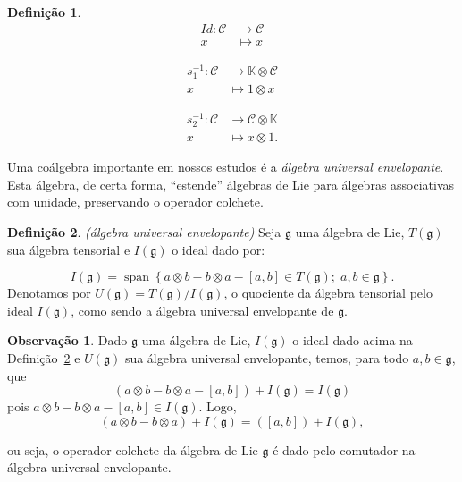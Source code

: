 \documentclass[twoside,openright,titlepage,numbers=noenddot,headinclude,  lineheaders footinclude=true,cleardoublepage=empty,
                                BCOR=5mm,paper=a4,fontsize=12pt ]{scrbook}
\theoremstyle{definition}
\newtheorem{definicao}{Definição}[chapter]
\newtheorem*{obs*}{Observação}
\DeclareMathOperator{\spn}{span}
\begin{document}
\begin{definicao}
\begin{minipage}{.33\textwidth}
    \begin{align*}
        Id: \mathcal{C} & \rightarrow \mathcal{C}\\
        x & \mapsto x
    \end{align*}
\end{minipage}%
\begin{minipage}{.33\textwidth}
    \begin{align*}
        s^{-1}_1: \mathcal{C}& \rightarrow \mathbb{K} \otimes \mathcal{C}  \\
        x & \mapsto 1\otimes x
    \end{align*}
\end{minipage}%
\begin{minipage}{.33\textwidth}
    \begin{align*}
        s^{-1}_2:  \mathcal{C}&  \rightarrow  \mathcal{C} \otimes \mathbb{K} \\
        x & \mapsto x \otimes 1.
    \end{align*}
\end{minipage}
\end{definicao}

Uma coálgebra importante em nossos estudos é a \textit{álgebra universal envelopante}.
Esta álgebra, de certa forma, ``estende'' álgebras de Lie para álgebras associativas com unidade,
preservando o operador colchete. 
\begin{definicao} 
\label{algUniv}
 \textit{(álgebra universal envelopante)} Seja $\mathfrak{g}$ uma álgebra de Lie, $T(\mathfrak{g})$ sua álgebra tensorial e
$I(\mathfrak{g})$ o ideal dado por:

\begin{equation*} \tag{$\ast$} \label{idealUniv}
I(\mathfrak{g}) = \spn \left\{ a \otimes b - b \otimes a - [a,b] \in T(\mathfrak{g}); \;
								  a,b \in \mathfrak{g} \right\}. 
\end{equation*}
Denotamos por $U(\mathfrak{g}) = T(\mathfrak{g}) / I(\mathfrak{g})$, o quociente da álgebra 
tensorial pelo ideal $I(\mathfrak{g})$, como sendo a álgebra universal envelopante de $\mathfrak{g}$.
\end{definicao}

\begin{obs*}
Dado $\mathfrak{g}$ uma álgebra de Lie, $I(\mathfrak{g})$ o ideal dado acima
na Definição~\ref{algUniv} e $U(\mathfrak{g})$ sua álgebra universal envelopante, temos, para
todo $a, b \in \mathfrak{g}$, que
\[ ( a \otimes b - b \otimes a - [a, b]) + I(\mathfrak{g}) = I(\mathfrak{g}) \]
pois $a \otimes b - b \otimes a - [a, b] \in I(\mathfrak{g})$. Logo,
\[ ( a \otimes b - b \otimes a ) + I(\mathfrak{g}) = ([a,b]) + I(\mathfrak{g}), \]
\end{obs*}
ou seja, o operador colchete da álgebra de Lie $\mathfrak{g}$ é dado pelo comutador
 na álgebra universal envelopante. 
\end{document}
